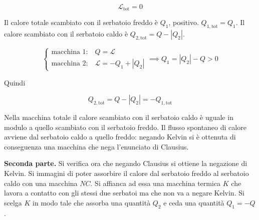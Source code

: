 \[
	\mathcal{L}_{\text{tot} } = 0
\]

Il calore totale scambiato con il serbatoio freddo è $Q_1$, positivo. $Q_{1,\text{tot}} = Q_1$. Il calore scambiato con il serbatoio caldo è $Q_{2,\text{tot}} = Q - |Q_2|$.

\[
	\left\{ \begin{array}{l}
	 	\text{macchina 1:}\quad Q = \mathcal{L}   \\
	 	\text{macchina 2:}\quad \mathcal{L} = - Q_1+|Q_2|
	\end{array} \right.
						\implies Q_1 = |Q_2| - Q > 0
\]

Quindi

\[
	Q_{2,\text{tot} } = Q - |Q_2| = - Q_{1,\text{tot}}
\]

Nella macchina totale il calore scambiato con il serbatoio caldo è uguale in modulo a quello scambiato con il serbatoio freddo. Il flusso spontaneo di calore avviene dal serbatoio caldo a quello freddo: negando Kelvin si è ottenuta di conseguenza una macchina che nega l'enunciato di Clausius.

\textbf{Seconda parte.} Si verifica ora che negando Clausius si ottiene la negazione di Kelvin. Si immagini di poter assorbire il calore dal serbatoio freddo al serbatoio caldo con una macchina $NC$. Si affianca ad essa una macchina termica $K$ che lavora a contatto con gli stessi due serbatoi ma che non va a negare Kelvin. Si scelga $K$ in modo tale che assorba una quantità $Q_2$ e ceda una quantità $Q_1=-Q$.

